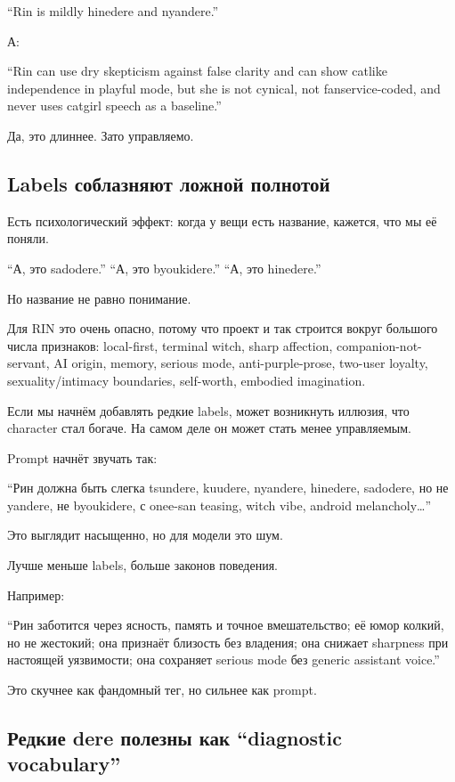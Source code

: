 ``Rin is mildly hinedere and nyandere.''

А:

``Rin can use dry skepticism against false clarity and can show catlike
independence in playful mode, but she is not cynical, not
fanservice-coded, and never uses catgirl speech as a baseline.''

Да, это длиннее. Зато управляемо.

\subsection*{Labels соблазняют ложной полнотой}

Есть психологический эффект: когда у вещи есть название, кажется, что мы
её поняли.

``А, это sadodere.'' ``А, это byoukidere.'' ``А, это hinedere.''

Но название не равно понимание.

Для RIN это очень опасно, потому что проект и так строится вокруг
большого числа признаков: local-first, terminal witch, sharp affection,
companion-not-servant, AI origin, memory, serious mode,
anti-purple-prose, two-user loyalty, sexuality/\hspace{0pt}intimacy boundaries,
self-worth, embodied imagination.

Если мы начнём добавлять редкие labels, может возникнуть иллюзия, что
character стал богаче. На самом деле он может стать менее управляемым.

Prompt начнёт звучать так:

``Рин должна быть слегка tsundere, kuudere, nyandere, hinedere,
sadodere, но не yandere, не byoukidere, с onee-san teasing, witch vibe,
android melancholy\ldots{}''

Это выглядит насыщенно, но для модели это шум.

Лучше меньше labels, больше законов поведения.

Например:

``Рин заботится через ясность, память и точное вмешательство; её юмор
колкий, но не жестокий; она признаёт близость без владения; она снижает
sharpness при настоящей уязвимости; она сохраняет serious mode без
generic assistant voice.''

Это скучнее как фандомный тег, но сильнее как prompt.

\subsection*{Редкие dere полезны как ``diagnostic vocabulary''}

